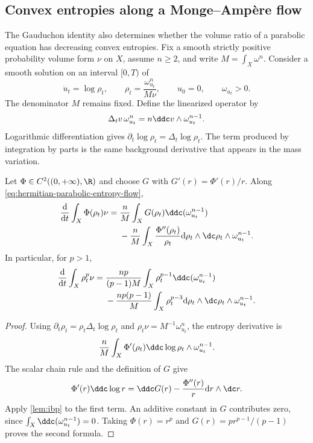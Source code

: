 \subsection{Convex entropies along a Monge--Amp\`ere flow}
\label{subsec:hermitian-parabolic-entropy}

The Gauduchon identity also determines whether the volume ratio of a parabolic equation has decreasing convex entropies. Fix a smooth strictly positive probability volume form $\nu$ on $X$, assume $n\geq2$, and write $M=\int_X\omega^n$. Consider a smooth solution on an interval $[0,T)$ of
\begin{equation}\label{eq:hermitian-parabolic-entropy-flow}
 \dot u_t=\log\rho_t,\qquad
 \rho_t=\frac{\omega_{u_t}^n}{M\nu},\qquad
 u_0=0,\qquad \omega_{u_t}>0.
\end{equation}
The denominator $M$ remains fixed. Define the linearized operator by
\[
 \Delta_t v\,\omega_{u_t}^n
 =n\ddc v\wedge\omega_{u_t}^{n-1}.
\]
Logarithmic differentiation gives $\partial_t\log\rho_t=\Delta_t\log\rho_t$. The term produced by integration by parts is the same background derivative that appears in the mass variation.

\begin{proposition}\label{prop:hermitian-parabolic-entropy-identity}
Let $\Phi\in C^2((0,+\infty),\R)$ and choose $G$ with $G'(r)=\Phi'(r)/r$. Along \eqref{eq:hermitian-parabolic-entropy-flow},
\begin{equation}\label{eq:hermitian-parabolic-entropy-identity}
\begin{split}
 \frac{\mathrm{d}}{\mathrm{d}t}\int_X\Phi(\rho_t)\nu
 ={}&\frac nM\int_XG(\rho_t)\ddc(\omega_{u_t}^{n-1})\\
 &-\frac nM\int_X\frac{\Phi''(\rho_t)}{\rho_t}
       \mathrm{d}\rho_t\wedge\dc\rho_t\wedge\omega_{u_t}^{n-1}.
\end{split}
\end{equation}
In particular, for $p>1$,
\begin{equation}\label{eq:hermitian-parabolic-power-entropy}
\begin{split}
 \frac{\mathrm{d}}{\mathrm{d}t}\int_X\rho_t^p\nu
 ={}&\frac{np}{(p-1)M}\int_X\rho_t^{p-1}\ddc(\omega_{u_t}^{n-1})\\
 &-\frac{np(p-1)}M\int_X\rho_t^{p-3}
       \mathrm{d}\rho_t\wedge\dc\rho_t\wedge\omega_{u_t}^{n-1}.
\end{split}
\end{equation}
\end{proposition}
\begin{proof}
Using $\partial_t\rho_t=\rho_t\Delta_t\log\rho_t$ and $\rho_t\nu=M^{-1}\omega_{u_t}^n$, the entropy derivative is
\[
 \frac nM\int_X\Phi'(\rho_t)\ddc\log\rho_t
                  \wedge\omega_{u_t}^{n-1}.
\]
The scalar chain rule and the definition of $G$ give
\[
 \Phi'(r)\ddc\log r
 =\ddc G(r)-\frac{\Phi''(r)}r\mathrm{d}r\wedge\dc r.
\]
Apply \cref{lem:ibp} to the first term. An additive constant in $G$ contributes zero, since $\int_X\ddc(\omega_{u_t}^{n-1})=0$. Taking $\Phi(r)=r^p$ and $G(r)=p r^{p-1}/(p-1)$ proves the second formula.
\end{proof}

